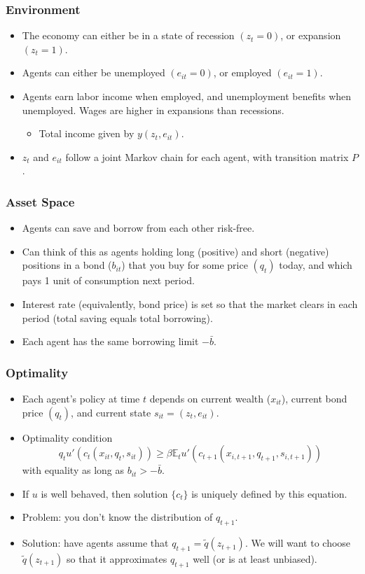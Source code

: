 \documentclass[handout]{beamer}
\newcommand{\E}{\mathbb{E}}
\theoremstyle{definition}
\begin{document}
\begin{frame}
  \frametitle{Environment}
  \begin{itemize}[<+->]
  \item The economy can either be in a state of recession $(z_t = 0)$, or expansion $(z_t = 1)$.
  \item Agents can either be unemployed $(e_{it} = 0)$, or employed $(e_{it} = 1)$.
  \item Agents earn labor income when employed, and unemployment benefits when unemployed. Wages are higher in expansions than recessions.
    \begin{itemize}
    \item Total income given by $y(z_t, e_{it})$.
    \end{itemize}
  \item $z_t$ and $e_{it}$ follow a joint Markov chain for each agent, with transition matrix $P$.
  \end{itemize}
\end{frame}

\begin{frame}
  \frametitle{Asset Space}
  \begin{itemize}[<+->]
  \item Agents can save and borrow from each other risk-free.
  \item Can think of this as agents holding long (positive) and short (negative) positions in a bond ($b_{it}$) that you buy for some price $(q_t)$ today, and which pays 1 unit of consumption next period.
  \item Interest rate (equivalently, bond price) is set so that the market clears in each period (total saving equals total borrowing).
  \item Each agent has the same borrowing limit $-\bar{b}$.
  \end{itemize}
\end{frame}

\begin{frame}
  \frametitle{Optimality}
  \begin{itemize}[<+->]
  \item Each agent's policy at time $t$ depends on current wealth ($x_{it}$), current bond price $(q_t)$, and current state $s_{it} = (z_t, e_{it})$.
  \item Optimality condition
    \[ q_t u'(c_t(x_{it}, q_t, s_{it})) \ge \beta \E_t u'(c_{t+1}(x_{i,t+1}, q_{t+1}, s_{i,t+1})) \]
    with equality as long as $b_{it} > -\bar{b}$.
  \item If $u$ is well behaved, then solution $\{c_t\}$ is uniquely defined by this equation.
  \item Problem: you don't know the distribution of $q_{t+1}$.
  \item Solution: have agents assume that $q_{t+1} = \tilde{q}(z_{t+1})$. We will want to choose $\tilde{q}(z_{t+1})$ so that it approximates $q_{t+1}$ well (or is at least unbiased).
  \end{itemize}
\end{frame}
\end{document}
